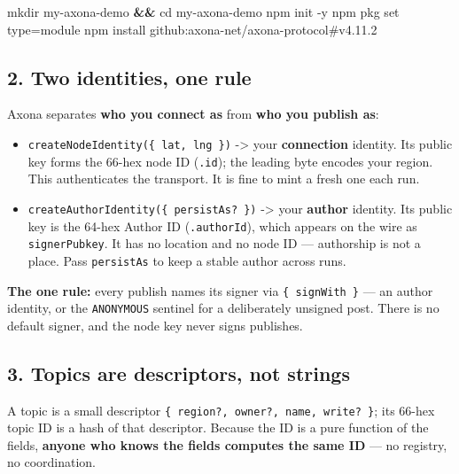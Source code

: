 \documentclass[
  nobib]{tufte-handout}
\newenvironment{Shaded}{}{}
\newcommand{\AttributeTok}[1]{\textcolor[rgb]{0.49,0.56,0.16}{#1}}
\newcommand{\BuiltInTok}[1]{\textcolor[rgb]{0.00,0.50,0.00}{#1}}
\newcommand{\ExtensionTok}[1]{#1}
\newcommand{\FunctionTok}[1]{\textcolor[rgb]{0.02,0.16,0.49}{#1}}
\newcommand{\KeywordTok}[1]{\textcolor[rgb]{0.00,0.44,0.13}{\textbf{#1}}}
\newcommand{\NormalTok}[1]{#1}
\providecommand{\tightlist}{%
  \setlength{\itemsep}{0pt}\setlength{\parskip}{0pt}}
\begin{document}
\begin{Shaded}
\begin{Highlighting}[]
\FunctionTok{mkdir}\NormalTok{ my{-}axona{-}demo }\KeywordTok{\&\&} \BuiltInTok{cd}\NormalTok{ my{-}axona{-}demo}
\ExtensionTok{npm}\NormalTok{ init }\AttributeTok{{-}y}
\ExtensionTok{npm}\NormalTok{ pkg set type=module}
\ExtensionTok{npm}\NormalTok{ install github:axona{-}net/axona{-}protocol\#v4.11.2}
\end{Highlighting}
\end{Shaded}

\subsection{2. Two identities, one rule}\label{two-identities-one-rule}

Axona separates \textbf{who you connect as} from \textbf{who you publish
as}:

\begin{itemize}
\tightlist
\item
  \texttt{createNodeIdentity(\{\ lat,\ lng\ \})} -\textgreater{} your
  \textbf{connection} identity. Its public key forms the 66-hex node ID
  (\texttt{.id}); the leading byte encodes your region. This
  authenticates the transport. It is fine to mint a fresh one each run.
\item
  \texttt{createAuthorIdentity(\{\ persistAs?\ \})} -\textgreater{} your
  \textbf{author} identity. Its public key is the 64-hex Author ID
  (\texttt{.authorId}), which appears on the wire as
  \texttt{signerPubkey}. It has no location and no node ID ---
  authorship is not a place. Pass \texttt{persistAs} to keep a stable
  author across runs.
\end{itemize}

\textbf{The one rule:} every publish names its signer via
\texttt{\{\ signWith\ \}} --- an author identity, or the
\texttt{ANONYMOUS} sentinel for a deliberately unsigned post. There is
no default signer, and the node key never signs publishes.

\subsection{3. Topics are descriptors, not
strings}\label{topics-are-descriptors-not-strings}

A topic is a small descriptor
\texttt{\{\ region?,\ owner?,\ name,\ write?\ \}}; its 66-hex topic ID
is a hash of that descriptor. Because the ID is a pure function of the
fields, \textbf{anyone who knows the fields computes the same ID} --- no
registry, no coordination.
\end{document}
